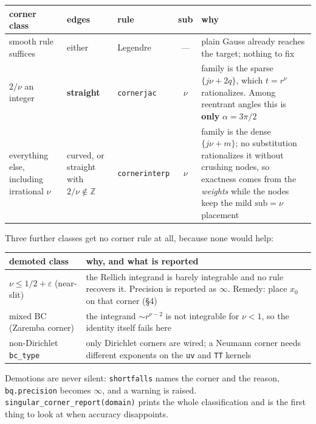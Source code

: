 \documentclass[11pt]{article}
\newcommand{\code}[1]{\texttt{#1}}
\begin{document}
\begin{center}\small
\begin{tabularx}{\textwidth}{@{}L l l c L@{}}
\toprule
\textbf{corner class} & \textbf{edges} & \textbf{rule} & \textbf{sub} & \textbf{why} \\
\midrule
smooth rule suffices
  & either & Legendre & --- &
  plain Gauss already reaches the target; nothing to fix \\
$2/\nu$ an integer
  & \textbf{straight} & \code{cornerjac} & $\nu$ &
  family is the sparse $\{j\nu + 2q\}$, which $t = r^\nu$ rationalizes. Among
  reentrant angles this is \textbf{only} $\alpha = 3\pi/2$ \\
everything else, including irrational $\nu$
  & curved, or straight with $2/\nu \notin \mathbb{Z}$ & \code{cornerinterp} & $\nu$ &
  family is the dense $\{j\nu + m\}$; no substitution rationalizes it without
  crushing nodes, so exactness comes from the \emph{weights} while the nodes
  keep the mild $\text{sub} = \nu$ placement \\
\bottomrule
\end{tabularx}
\end{center}

\noindent
Three further classes get no corner rule at all, because none would help:

\begin{center}\small
\begin{tabularx}{\textwidth}{@{}l L@{}}
\toprule
\textbf{demoted class} & \textbf{why, and what is reported} \\
\midrule
$\nu \le 1/2 + \varepsilon$ (near-slit) &
  the Rellich integrand is barely integrable and no rule recovers it. Precision
  is reported as $\infty$. Remedy: place $x_0$ on that corner (\S4) \\
mixed BC (Zaremba corner) &
  the integrand $\sim r^{\nu-2}$ is not integrable for $\nu<1$, so the identity
  itself fails here \\
non-Dirichlet \code{bc\_type} &
  only Dirichlet corners are wired; a Neumann corner needs different exponents
  on the \code{uv} and \code{TT} kernels \\
\bottomrule
\end{tabularx}
\end{center}

Demotions are never silent: \code{shortfalls} names the corner and the reason,
\code{bq.precision} becomes $\infty$, and a warning is raised.
\code{singular\_corner\_report(domain)} prints the whole classification and is
the first thing to look at when accuracy disappoints.
\end{document}
